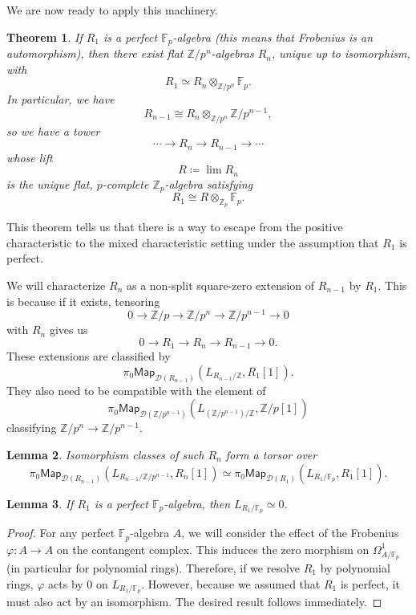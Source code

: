 \documentclass[10pt, oneside]{memoir}
\newtheorem{thm}{Theorem}[subsection]
\newtheorem{lem}[thm]{Lemma}
\theoremstyle{definition}
\theoremstyle{remark}
\theoremstyle{plain}
\theoremstyle{definition}
\theoremstyle{remark}
\newcommand{\Z}{\mathbb{Z}}
\newcommand{\F}{\mathbb{F}}
\newcommand{\mc}[1]{\mathcal{#1}}
\newcommand{\ms}[1]{\mathsf{#1}}
\newcommand{\1}{\mathbf{1}}
\newcommand{\2}{\mathbf{2}}
\newcommand{\3}{\mathbf{3}}
\begin{document}
We are now ready to apply this machinery.
\begin{thm}\label{thm:wittvectors}
    If \(R_1 \) is a perfect \(\F_p \)-algebra (this means that Frobenius is an automorphism), then there exist flat \(\Z/p^n \)-algebras \(R_n \), unique up to isomorphism, with 
    \[ R_1 \simeq R_n \otimes_{\Z/p^n} \F_p. \]
    In particular, we have
    \[ R_{n-1} \cong R_n \otimes_{\Z/p^n} \Z/p^{n-1}, \]
    so we have a tower
    \[ \cdots \to R_n \to R_{n-1} \to \cdots \]
    whose lift
    \[ R \coloneqq \lim R_n \]
    is the unique flat, \(p \)-complete \(\Z_p \)-algebra satisfying
    \[ R_1 \cong R \otimes_{\Z_p} \F_p. \]
\end{thm}

This theorem tells us that there is a way to escape from the positive characteristic to the mixed characteristic setting under the assumption that \(R_1 \) is perfect.

We will characterize \(R_n \) as a non-split square-zero extension of \(R_{n-1} \) by \(R_1 \). This is because if it exists, tensoring
\[ 0 \to \Z/p \to \Z/p^n \to \Z/p^{n-1} \to 0 \]
with \(R_n \) gives us
\[ 0 \to R_1 \to R_n \to R_{n-1} \to 0. \]
These extensions are classified by
\[ \pi_0 \ms{Map}_{\mc{D}(R_{n-1})} (L_{R_{n-1}/\Z}, R_1 [1]). \]
They also need to be compatible with the element of
\[ \pi_0 \ms{Map}_{\mc{D}(\Z/p^{n-1})}(L_{(\Z/p^{n-1})/\Z}, \Z/p[1]) \]
classifying \(\Z/p^n \to \Z/p^{n-1} \).

\begin{lem}
    Isomorphism classes of such \(R_n \) form a torsor over
    \[ \pi_0 \ms{Map}_{\mc{D}(R_{n-1})} (L_{R_{n-1}/\Z/p^{n-1}}, R_n[1]) \simeq \pi_0 \ms{Map}_{\mc{D}(R_1)} (L_{R_1/\F_p}, R_1[1]). \]
\end{lem}

\begin{lem}
    If \(R_1 \) is a perfect \(\F_p \)-algebra, then \(L_{R_1/\F_p} \simeq 0 \).
\end{lem}

\begin{proof}
    For any perfect \(\F_p \)-algebra \(A \), we will consider the effect of the Frobenius \(\varphi \colon A \to A \) on the contangent complex. This induces the zero morphism on \(\Omega^1_{A/\F_p} \) (in particular for polynomial rings). Therefore, if we resolve \(R_1 \) by polynomial rings, \(\varphi \) acts by \(0 \) on \(L_{R_1/\F_p} \). However, because we assumed that \(R_1 \) is perfect, it must also act by an isomorphism. The desired result follows immediately.
\end{proof}
\end{document}
